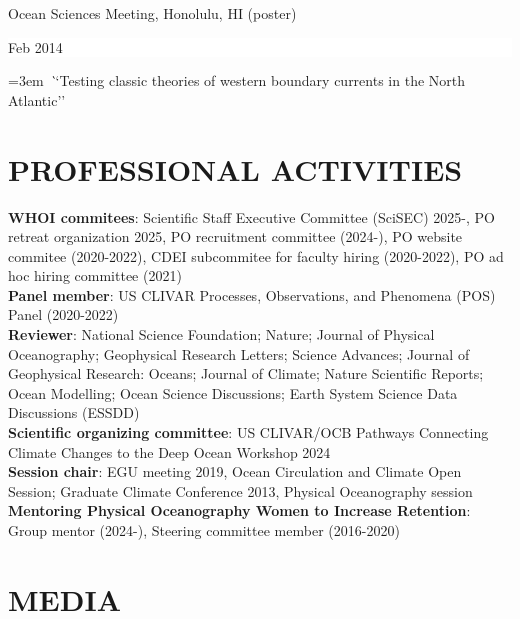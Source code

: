 \documentclass[paper=letter,fontsize=11pt]{scrartcl} %
\newcommand{\sepspace}{\vspace*{3mm}}		%
\newcommand{\NewPart}[2]{\section*{\uppercase{#1} #2}}
\newcommand{\ShortEntry}[2]{\normalsize \noindent \textbf{#1}: #2 \\ }
\newcommand{\TalkEntry}[3]{
		\noindent #1 \hfill      %
		\colorbox{White}{%
			\parbox{6em}{%
			\hfill\color{Black}#2}} \par  %
		\noindent\hangindent=3em\hangafter=0 \textit ``#3''\sepspace} %
\begin{document}
\TalkEntry{Ocean Sciences Meeting, Honolulu, HI (poster)}{Feb 2014}{Testing classic theories of western boundary currents in the North Atlantic}



\NewPart{Professional Activities}{}

\ShortEntry{WHOI commitees}{Scientific Staff Executive Committee (SciSEC) 2025-, PO retreat organization 2025, PO recruitment committee (2024-), PO website commitee (2020-2022), CDEI subcommitee for faculty hiring (2020-2022), PO ad hoc hiring committee (2021)}

\ShortEntry{Panel member}{US CLIVAR Processes, Observations, and Phenomena (POS) Panel (2020-2022)}

\ShortEntry{Reviewer}{National Science Foundation; Nature; Journal of Physical Oceanography; Geophysical Research Letters; Science Advances; Journal of Geophysical Research: Oceans; Journal of Climate; Nature Scientific Reports; Ocean Modelling; Ocean Science Discussions; Earth System Science Data Discussions (ESSDD)}

\ShortEntry{Scientific organizing committee}{US CLIVAR/OCB Pathways Connecting Climate Changes to the Deep Ocean Workshop 2024}

\ShortEntry{Session chair}{EGU meeting 2019, Ocean Circulation and Climate Open Session; Graduate Climate Conference 2013, Physical Oceanography session}

\ShortEntry{Mentoring Physical Oceanography Women to Increase Retention}{Group mentor (2024-), Steering committee member (2016-2020)}




\NewPart{Media}{}
\end{document}

